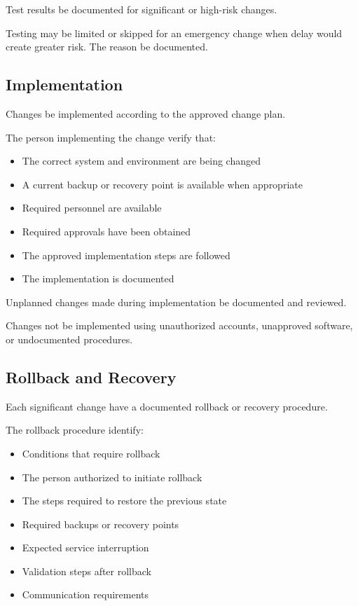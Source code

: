 Test results \must{} be documented for significant or high-risk changes.

Testing may be limited or skipped for an emergency change when delay would create greater risk. The reason \must{} be documented.

\subsection{Implementation}

Changes \must{} be implemented according to the approved change plan.

The person implementing the change \must{} verify that:
\begin{itemize}
    \item The correct system and environment are being changed
    \item A current backup or recovery point is available when appropriate
    \item Required personnel are available
    \item Required approvals have been obtained
    \item The approved implementation steps are followed
    \item The implementation is documented
\end{itemize}

Unplanned changes made during implementation \must{} be documented and reviewed.

Changes \must{} not be implemented using unauthorized accounts, unapproved software, or undocumented procedures.

\subsection{Rollback and Recovery}

Each significant change \must{} have a documented rollback or recovery procedure.

The rollback procedure \should{} identify:
\begin{itemize}
    \item Conditions that require rollback
    \item The person authorized to initiate rollback
    \item The steps required to restore the previous state
    \item Required backups or recovery points
    \item Expected service interruption
    \item Validation steps after rollback
    \item Communication requirements
\end{itemize}

